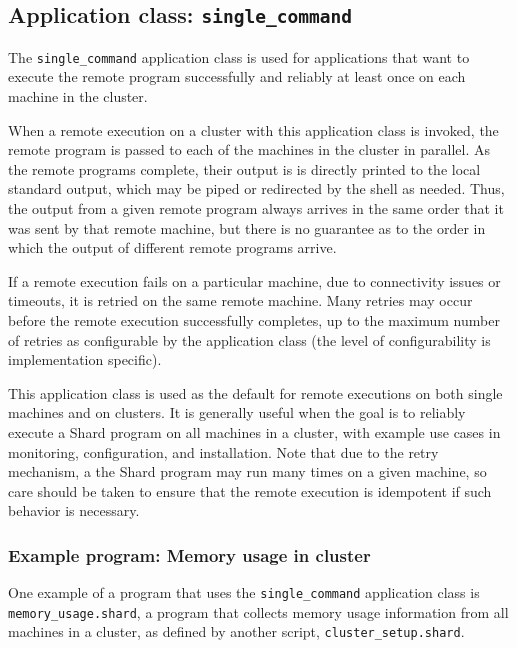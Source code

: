 \documentclass[twoside]{report}
\begin{document}
\subsection{Application class: \texttt{single\_command}}

The \texttt{single\_command} application class is used for applications that want to execute the remote program successfully and reliably at least once on each machine in the cluster.

When a remote execution on a cluster with this application class is invoked, the remote program is passed to each of the machines in the cluster in parallel.
As the remote programs complete, their output is is directly printed to the local standard output, which may be piped or redirected by the shell as needed.
Thus, the output from a given remote program always arrives in the same order that it was sent by that remote machine, but there is no guarantee as to the order in which the output of different remote programs arrive.

If a remote execution fails on a particular machine, due to connectivity issues or timeouts, it is retried on the same remote machine.
Many retries may occur before the remote execution successfully completes, up to the maximum number of retries as configurable by the application class (the level of configurability is implementation specific).

This application class is used as the default for remote executions on both single machines and on clusters.
It is generally useful when the goal is to reliably execute a Shard program on all machines in a cluster, with example use cases in monitoring, configuration, and installation.
Note that due to the retry mechanism, a the Shard program may run many times on a given machine, so care should be taken to ensure that the remote execution is idempotent if such behavior is necessary.

\subsubsection{Example program: Memory usage in cluster}

\begin{sloppypar}
  One example of a program that uses the \texttt{single\_command} application class is \texttt{memory\_usage.shard}, a program that collects memory usage information from all machines in a cluster, as defined by another script, \texttt{cluster\_setup.shard}.
\end{sloppypar}
\end{document}
